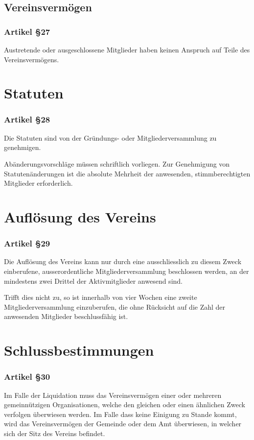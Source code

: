 \documentclass[a4paper,
               10pt,
               fleqn]{article}
\begin{document}
\subsection{Vereinsvermögen}

\subsubsection*{Artikel §27}
Austretende oder ausgeschlossene Mitglieder haben keinen 
Anspruch auf Teile des Vereinsvermögens.

\section{Statuten}

\subsubsection*{Artikel §28}
Die Statuten sind von der Gründungs- oder 
Mitgliederversammlung zu genehmigen.

Abänderungsvorschläge müssen schriftlich vorliegen.
Zur Genehmigung von Statutenänderungen ist die absolute
Mehrheit der anwesenden, stimmberechtigten Mitglieder
erforderlich.

\section{Auflösung des Vereins}

\subsubsection*{Artikel §29}
Die Auflösung des Vereins kann nur durch eine
ausschliesslich zu diesem Zweck einberufene,
ausserordentliche Mitgliederversammlung beschlossen werden,
an der mindestens zwei Drittel der Aktivmitglieder anwesend
sind.

Trifft dies nicht zu, so ist innerhalb von vier Wochen eine 
zweite Mitgliederversammlung einzuberufen, die ohne
Rücksicht auf die Zahl der anwesenden Mitglieder
beschlussfähig ist.

\section{Schlussbestimmungen}

\subsubsection*{Artikel §30}
Im Falle der Liquidation muss das Vereinsvermögen einer oder
mehreren gemeinnützigen Organisationen, welche den gleichen
oder einen ähnlichen Zweck verfolgen überwiesen werden. Im
Falle dass keine Einigung zu Stande kommt, wird das
Vereinsvermögen der Gemeinde oder dem Amt überwiesen, in 
welcher sich der Sitz des Vereins befindet.
\end{document}
